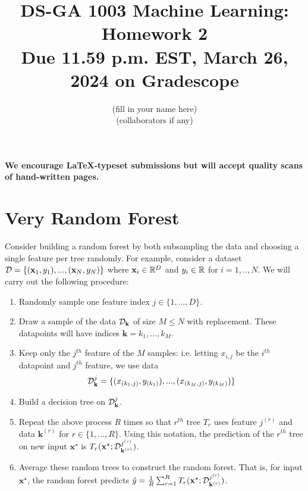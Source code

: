\documentclass[11pt]{article}
\begin{document}
\title{DS-GA 1003 Machine Learning: Homework 2 \\
\textbf{\large{Due 11.59 p.m. EST, March 26, 2024 on Gradescope}}}
\author{{\color{blue}(fill in your name here)}\\
    {\color{blue}(collaborators if any)}}
\date{}
\maketitle

\noindent \textbf{We encourage \LaTeX-typeset submissions but will accept quality scans of hand-written pages.}


\section{Very Random Forest}

Consider building a random forest by both subsampling the data and 
choosing a single feature per tree randomly. For example, consider a dataset $\mathcal{D} = \{({\mathbf x}_1,y_1),...,({\mathbf x}_N,y_N)\}$ where ${\mathbf x}_i\in\mathbb{R}^D$ and $y_i\in\mathbb{R}$ for $i=1,..,N$. We will carry out the following procedure:
\begin{enumerate}
    \item Randomly sample one feature index $j \in \{1,\dots,D\}$.
    
    \item Draw a sample of the data $\mathcal{D}_{\mathbf{k}}$ of size $M\leq N$ with replacement. These datapoints will have indices $\mathbf{k} = k_1,\dots,k_M$.
    
    \item Keep only the $j^{th}$ feature of the $M$ samples:
    i.e. letting $x_{i,j}$ be the $i^{th}$ datapoint and $j^{th}$ feature, we use data
    $$\mathcal{D}^{j}_{\mathbf{k}}=\{(x_{(k_1,j)},y_{(k_1)}),...,(x_{(k_M,j)},y_{(k_M)})\}$$
    
    \item Build a decision tree on $\mathcal{D}^{j}_{\mathbf{k}}$.
    
    \item Repeat the above process $R$ times so that $r^{th}$ tree $T_r$
    uses feature $j^{(r)}$ and data $\mathbf{k}^{(r)}$ for $r \in \{1,\ldots,R\}$. Using this notation, the prediction of the $r^{th}$ tree 
    on new input $\mathbf{x}^\star$
    is
    $T_r(\mathbf{x}^\star ;\mathcal{D}^{j^{(r)}}_{\mathbf{k}^{(r)}})$.
    
    \item Average these random trees to construct the random forest. That is, for input $\mathbf{x}^\star$, the random forest predicts $\hat{y} = \frac{1}{R} \sum^R_{r=1} T_r(\mathbf{x}^\star;\mathcal{D}^{j^{(r)}}_{\mathbf{k}^{(r)}})$.

\end{enumerate}
\end{document}
